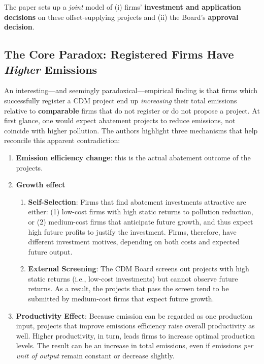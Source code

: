 \documentclass[12pt]{article}[margin=1in]
\begin{document}
The paper sets up a \emph{joint} model of (i) firms’ \textbf{investment and application decisions} on these offset-supplying projects and (ii) the Board’s \textbf{approval decision}.

\subsection{The Core Paradox: Registered Firms Have \emph{Higher} Emissions}

An interesting—and seemingly paradoxical—empirical finding is that firms which successfully register a CDM project end up \emph{increasing} their total emissions relative to \textbf{comparable} firms that do not register or do not propose a project. At first glance, one would expect abatement projects to reduce emissions, not coincide with higher pollution. The authors highlight three mechanisms that help reconcile this apparent contradiction:

\begin{enumerate}
    \item \textbf{Emission efficiency change}: this is the actual abatement outcome of the projects.

    \item \textbf{Growth effect}
          \begin{enumerate}
              \item \textbf{Self-Selection}: Firms that find abatement investments attractive are either: (1) low-cost firms with high static returns to pollution reduction, or (2) medium-cost firms that anticipate future growth, and thus expect high future profits to justify the investment. Firms, therefore, have different investment motives, depending on both costs and expected future output.

              \item \textbf{External Screening}: The CDM Board screens out projects with high static returns (i.e., low-cost investments) but cannot observe future returns. As a result, the projects that pass the screen tend to be submitted by medium-cost firms that expect future growth.
          \end{enumerate}

    \item \textbf{Productivity Effect}: Because emission can be regarded as one production input, projects that improve emissions efficiency raise overall productivity as well. Higher productivity, in turn, leads firms to increase optimal production levels. The result can be an increase in total emissions, even if emissions \emph{per unit of output} remain constant or decrease slightly.
\end{enumerate}
\end{document}
